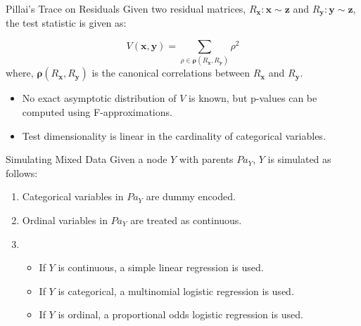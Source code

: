 \documentclass{beamer}
\begin{document}
\begin{frame}{Pillai's Trace on Residuals}
Given two residual matrices, $ R_{\mathbf{x}}: \mathbf{x} \sim \mathbf{z} $ and $ R_{\mathbf{y}}: \mathbf{y} \sim \mathbf{z} $, the test statistic is given as:

\begin{equation}
	\textit{V}(\mathbf{x}, \mathbf{y}) = \sum_{\rho \in \bm{\rho}(R_\mathbf{x}, R_\mathbf{y})} \rho^2
\end{equation}
where, $ \bm{\rho}({R_\mathbf{x}, R_\mathbf{y}}) $  is the canonical correlations between $ R_\mathbf{x} $ and $ R_\mathbf{y} $.

\vspace{1em}

\begin{itemize}
	\item No exact asymptotic distribution of $ V $ is known, but p-values can be computed using F-approximations. \footnotemark
	\item Test dimensionality is linear in the cardinality of categorical variables.
\end{itemize}

\end{frame}

\begin{frame}{Simulating Mixed Data}
	Given a node $ Y $ with parents $ Pa_Y $, $ Y $ is simulated as follows:
	\begin{enumerate}
		\item Categorical variables in $ Pa_Y $ are dummy encoded.
		\item Ordinal variables in $Pa_Y$ are treated as continuous.
		\item \begin{itemize}
			\item If $ Y $ is continuous, a simple linear regression is used.
			\item If $ Y $ is categorical, a multinomial logistic regression is used.
			\item If $ Y $ is ordinal, a proportional odds logistic regression is used.
		\end{itemize}
	\end{enumerate}
\end{frame}
\end{document}
